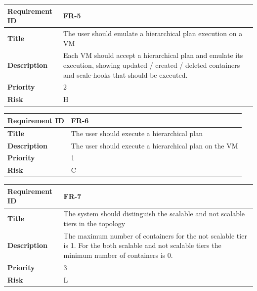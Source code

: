 \begin{table}[ht]
  \begin{tabular}{|p{3.5cm}|p{8cm}|}
  \hline
    \textbf{Requirement ID}  & FR-5 \\
  \hline
    \textbf{Title}  & \begin{sloppypar}The user should emulate a hierarchical plan execution on a VM \end{sloppypar}\\
  \hline
    \textbf{Description}  & \begin{sloppypar}Each VM should accept a hierarchical plan and emulate its execution, showing updated / created / deleted containers and scale-hooks that should be executed.\end{sloppypar}\\
  \hline
    \textbf{Priority}  & 2\\
  \hline
    \textbf{Risk}  & H \\
  \hline
  \end{tabular}
\end{table}

\begin{table}[ht]
  \begin{tabular}{|p{3.5cm}|p{8cm}|}
  \hline
    \textbf{Requirement ID}  & FR-6 \\
  \hline
    \textbf{Title}  & \begin{sloppypar}The user should execute a hierarchical plan \end{sloppypar}\\
  \hline
    \textbf{Description}  & \begin{sloppypar}The user should execute a hierarchical plan on the VM\end{sloppypar}\\
  \hline
    \textbf{Priority}  & 1\\
  \hline
    \textbf{Risk}  & C \\
  \hline
  \end{tabular}
\end{table}

\begin{table}[ht]
  \begin{tabular}{|p{3.5cm}|p{8cm}|}
  \hline
    \textbf{Requirement ID}  & FR-7 \\
  \hline
    \textbf{Title}  & \begin{sloppypar}The system should distinguish the scalable and not scalable tiers in the topology \end{sloppypar}\\
  \hline
    \textbf{Description}  & \begin{sloppypar}The maximum number of containers for the not scalable tier is 1. For the both scalable and not scalable tiers the minimum number of containers is 0.\end{sloppypar}\\
  \hline
    \textbf{Priority}  & 3\\
  \hline
    \textbf{Risk}  & L \\
  \hline
  \end{tabular}
\end{table}

